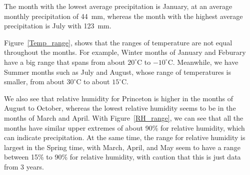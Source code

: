 \documentclass[11pt]{report}
\begin{document}
The month with the lowest average precipitation is January, at an average
monthly precipitation of 44~mm, whereas the month with the highest average
precipitation is July with 123~mm.

Figure~\ref{Temp_range}, shows that the ranges of temperature are not equal
throughout the months. For example, Winter months of January and Feburary
have a big range that spans from about $20 ^\circ $C to $-10
^\circ$C. Meanwhile, we have Summer months such as July and August, whose
range of temperatures is smaller, from about $30 ^\circ $C to about $15
^\circ $C.

We also see that relative humidity for Princeton is higher in the months of
August to October, whereas the lowest relative humidity seems to be in the
months of March and April.  With Figure~\ref{RH_range}, we can see that all
the months have similar upper extremes of about 90\% for relative humidity,
which can indicate precipitation. At the same time, the range for relative
humidity is largest in the Spring time, with March, April, and May seem to
have a range between 15\% to 90\% for relative humidity, with caution that
this is just data from 3 years.
\end{document}
